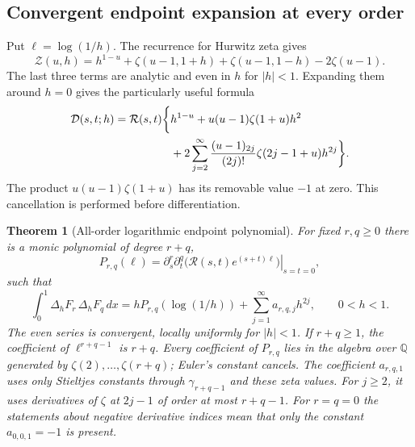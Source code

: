 \documentclass[11pt,a4paper]{article}
\numberwithin{equation}{section}
\newtheorem{theorem}{Theorem}[section]
\theoremstyle{definition}
\theoremstyle{remark}
\begin{document}
\subsection{Convergent endpoint expansion at every order}

Put $\ell=\log(1/h)$. The recurrence for Hurwitz zeta gives
\begin{equation}\label{eq:Z-split}
 \mathcal Z(u,h)=h^{1-u}+\zeta(u-1,1+h)+\zeta(u-1,1-h)-2\zeta(u-1).
\end{equation}
The last three terms are analytic and even in $h$ for $|h|<1$.
Expanding them around $h=0$ gives the particularly useful formula
\begin{align}
 \mathcal D(s,t;h)=\mathcal R(s,t)\biggl\{
 &h^{1-u}+u(u-1)\zeta(1+u)h^2\notag\\
 &+2\sum_{j=2}^{\infty}
   \frac{(u-1)_{2j}}{(2j)!}\zeta(2j-1+u)h^{2j}\biggr\}.
 \label{eq:convergent-expansion}
\end{align}
The product $u(u-1)\zeta(1+u)$ has its removable value $-1$ at zero.
This cancellation is performed before differentiation.

\begin{theorem}[All-order logarithmic endpoint polynomial]
\label{thm:cusp}
For fixed $r,q\geq0$ there is a monic polynomial of degree $r+q$,
\begin{equation}\label{eq:P-def}
 P_{r,q}(\ell)=
 \left.\partial_s^r\partial_t^q
     \bigl(\mathcal R(s,t)e^{(s+t)\ell}\bigr)\right|_{s=t=0},
\end{equation}
such that
\begin{equation}\label{eq:cusp}
 \int_0^1\Delta_hF_r\,\Delta_hF_q\,dx
   =hP_{r,q}(\log(1/h))+
           \sum_{j=1}^{\infty}a_{r,q,j}h^{2j},\qquad 0<h<1.
\end{equation}
The even series is convergent, locally uniformly for $|h|<1$.
If $r+q\geq1$, the coefficient of $\ell^{r+q-1}$ is $r+q$.
Every coefficient of $P_{r,q}$ lies in the algebra over $\mathbb Q$
generated by $\zeta(2),\ldots,\zeta(r+q)$; Euler's constant cancels.
The coefficient $a_{r,q,1}$ uses only Stieltjes constants through
$\gamma_{r+q-1}$ and these zeta values. For $j\geq2$, it uses
derivatives of $\zeta$ at $2j-1$ of order at most $r+q-1$.
For $r=q=0$ the statements about negative derivative indices mean that
only the constant $a_{0,0,1}=-1$ is present.
\end{theorem}
\end{document}
